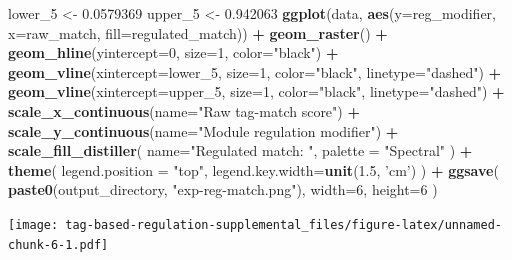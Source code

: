 \documentclass[]{book}
\newenvironment{Shaded}{\begin{snugshade}}{\end{snugshade}}
\newcommand{\DataTypeTok}[1]{\textcolor[rgb]{0.13,0.29,0.53}{#1}}
\newcommand{\DecValTok}[1]{\textcolor[rgb]{0.00,0.00,0.81}{#1}}
\newcommand{\FloatTok}[1]{\textcolor[rgb]{0.00,0.00,0.81}{#1}}
\newcommand{\KeywordTok}[1]{\textcolor[rgb]{0.13,0.29,0.53}{\textbf{#1}}}
\newcommand{\NormalTok}[1]{#1}
\newcommand{\OperatorTok}[1]{\textcolor[rgb]{0.81,0.36,0.00}{\textbf{#1}}}
\newcommand{\StringTok}[1]{\textcolor[rgb]{0.31,0.60,0.02}{#1}}
\begin{document}
\begin{Shaded}
\begin{Highlighting}[]
\NormalTok{lower_}\DecValTok{5}\NormalTok{ <-}\StringTok{ }\FloatTok{0.0579369}
\NormalTok{upper_}\DecValTok{5}\NormalTok{ <-}\StringTok{ }\FloatTok{0.942063}
\KeywordTok{ggplot}\NormalTok{(data, }\KeywordTok{aes}\NormalTok{(}\DataTypeTok{y=}\NormalTok{reg_modifier, }\DataTypeTok{x=}\NormalTok{raw_match, }\DataTypeTok{fill=}\NormalTok{regulated_match)) }\OperatorTok{+}
\StringTok{  }\KeywordTok{geom_raster}\NormalTok{() }\OperatorTok{+}
\StringTok{  }\KeywordTok{geom_hline}\NormalTok{(}\DataTypeTok{yintercept=}\DecValTok{0}\NormalTok{, }\DataTypeTok{size=}\DecValTok{1}\NormalTok{, }\DataTypeTok{color=}\StringTok{"black"}\NormalTok{) }\OperatorTok{+}
\StringTok{  }\KeywordTok{geom_vline}\NormalTok{(}\DataTypeTok{xintercept=}\NormalTok{lower_}\DecValTok{5}\NormalTok{, }\DataTypeTok{size=}\DecValTok{1}\NormalTok{, }\DataTypeTok{color=}\StringTok{"black"}\NormalTok{, }\DataTypeTok{linetype=}\StringTok{"dashed"}\NormalTok{) }\OperatorTok{+}
\StringTok{  }\KeywordTok{geom_vline}\NormalTok{(}\DataTypeTok{xintercept=}\NormalTok{upper_}\DecValTok{5}\NormalTok{, }\DataTypeTok{size=}\DecValTok{1}\NormalTok{, }\DataTypeTok{color=}\StringTok{"black"}\NormalTok{, }\DataTypeTok{linetype=}\StringTok{"dashed"}\NormalTok{) }\OperatorTok{+}
\StringTok{  }\KeywordTok{scale_x_continuous}\NormalTok{(}\DataTypeTok{name=}\StringTok{"Raw tag-match score"}\NormalTok{) }\OperatorTok{+}
\StringTok{  }\KeywordTok{scale_y_continuous}\NormalTok{(}\DataTypeTok{name=}\StringTok{"Module regulation modifier"}\NormalTok{) }\OperatorTok{+}
\StringTok{  }\KeywordTok{scale_fill_distiller}\NormalTok{(}
    \DataTypeTok{name=}\StringTok{"Regulated match:  "}\NormalTok{,}
    \DataTypeTok{palette =} \StringTok{"Spectral"}
\NormalTok{  ) }\OperatorTok{+}
\StringTok{  }\KeywordTok{theme}\NormalTok{(}
    \DataTypeTok{legend.position =} \StringTok{"top"}\NormalTok{,}
    \DataTypeTok{legend.key.width=}\KeywordTok{unit}\NormalTok{(}\FloatTok{1.5}\NormalTok{, }\StringTok{'cm'}\NormalTok{)}
\NormalTok{  ) }\OperatorTok{+}
\StringTok{  }\KeywordTok{ggsave}\NormalTok{(}
    \KeywordTok{paste0}\NormalTok{(output_directory, }\StringTok{"exp-reg-match.png"}\NormalTok{),}
    \DataTypeTok{width=}\DecValTok{6}\NormalTok{,}
    \DataTypeTok{height=}\DecValTok{6}
\NormalTok{  )}
\end{Highlighting}
\end{Shaded}

\texttt{[image: tag-based-regulation-supplemental\_files/figure-latex/unnamed-chunk-6-1.pdf]}
\end{document}

